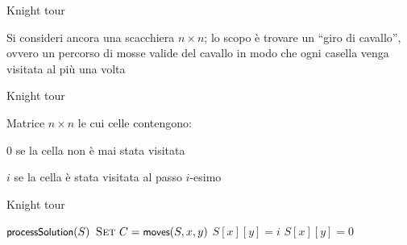 \begin{frame}{Knight tour}

\vspace{-9pt}
\begin{myboxtitle}[Problema]
 Si consideri ancora una scacchiera $n \times n$; lo scopo è trovare un “giro di
cavallo”, ovvero un percorso di mosse valide del cavallo in modo che ogni
casella venga visitata al più una volta
\end{myboxtitle}

\end{frame}

\begin{frame}{Knight tour}

\vspace{-9pt}
\begin{myboxtitle}[Soluzione]
Matrice $n \times n$ le cui celle contengono: 
	\BIL
  \item $0$	\qquad	se la cella non è mai stata visitata
  \item $i$	\qquad	se la cella è stata visitata al passo $i$-esimo
	\EIL
\end{myboxtitle}

\end{frame}

\begin{frame}{Knight tour}

\vspace{-9pt}
\begin{Procedure}
\caption[A]{\BOOLEAN {}($\INTEGER[\,][\,]\ S$, \INTEGER $i$, \INTEGER $x$, \INTEGER $y$)}
{
  $\textsf{{\small processSolution}}(S)$\;
  \Return \TRUE\;
}{
  $\textsc{Set}\ C = \textsf{{\small moves}}(S, x, y)$\;
  {
    $S[x][y] = i$\;
    $S[x][y] = 0$\;
  }
  \Return \FALSE\;
}
\end{Procedure}

\end{frame}

